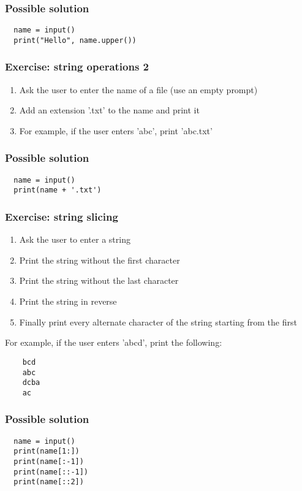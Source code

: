 \documentclass[14pt,compress]{beamer}
\begin{document}
\begin{frame}
\frametitle{Possible solution}
\begin{lstlisting}
  name = input()
  print("Hello", name.upper())
\end{lstlisting}
\end{frame}

\begin{frame}[plain]
  \frametitle{Exercise: string operations 2}
  \begin{enumerate}
  \item Ask the user to enter the name of a file (use an empty prompt)
  \item Add an extension '.txt' to the name and print it
  \item For example, if the user enters 'abc', print 'abc.txt'
  \end{enumerate}
\end{frame}

\begin{frame}
\frametitle{Possible solution}
\begin{lstlisting}
  name = input()
  print(name + '.txt')
\end{lstlisting}

\end{frame}


\begin{frame}
  \frametitle{Exercise: string slicing}
  \begin{enumerate}
  \item Ask the user to enter a string
  \item Print the string without the first character
  \item Print the string without the last character
  \item Print the string in reverse
  \item Finally print every alternate character of the string starting from
    the first
  \end{enumerate}
  For example, if the user enters 'abcd', print the following:
  \begin{lstlisting}
    bcd
    abc
    dcba
    ac
  \end{lstlisting}
\end{frame}

\begin{frame}
\frametitle{Possible solution}
\begin{lstlisting}
  name = input()
  print(name[1:])
  print(name[:-1])
  print(name[::-1])
  print(name[::2])
\end{lstlisting}

\end{frame}
\end{document}
